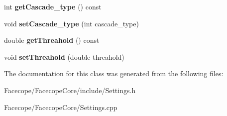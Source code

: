 \begin{DoxyCompactItemize}
int {\bfseries get\+Cascade\+\_\+type} () const
\item 
\mbox{\label{classSettings_a78eae3234274546189cda1ed0a23474e}} 
void {\bfseries set\+Cascade\+\_\+type} (int cascade\+\_\+type)
\item 
\mbox{\label{classSettings_abe7d3259a7f2716282fd836f0c098c71}} 
double {\bfseries get\+Threahold} () const
\item 
\mbox{\label{classSettings_afac24f0d98c2ad0e7cefa606b069b3bb}} 
void {\bfseries set\+Threahold} (double threahold)
\end{DoxyCompactItemize}


The documentation for this class was generated from the following files\+:\begin{DoxyCompactItemize}
\item 
Facecope/\+Facecope\+Core/include/Settings.\+h\item 
Facecope/\+Facecope\+Core/Settings.\+cpp\end{DoxyCompactItemize}
